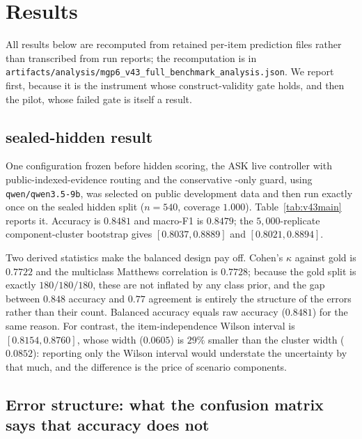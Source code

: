 \section{Results}
\label{sec:results}

All results below are recomputed from retained per-item prediction files rather
than transcribed from run reports; the recomputation is in
\texttt{artifacts/analysis/mgp6\_v43\_full\_benchmark\_analysis.json}. We report
\mgpc{} first, because it is the instrument whose construct-validity gate holds,
and then the \mgp{} pilot, whose failed gate is itself a result.

\subsection{\mgpc{} sealed-hidden result}
\label{sec:results:hidden}

One configuration frozen before hidden scoring, the ASK live controller with
public-indexed-evidence routing and the conservative \abstain-only guard, using
\texttt{qwen/qwen3.5-9b}, was selected on public development data and then run
exactly once on the sealed hidden split ($n=540$, coverage $1.000$).
Table~\ref{tab:v43main} reports it. Accuracy is $0.8481$ and macro-F1 is
$0.8479$; the $5{,}000$-replicate component-cluster bootstrap gives
$[0.8037, 0.8889]$ and $[0.8021, 0.8894]$.

Two derived statistics make the balanced design pay off. Cohen's $\kappa$
against gold is $0.7722$ and the multiclass Matthews correlation is $0.7728$;
because the gold split is exactly $180/180/180$, these are not inflated by any
class prior, and the gap between $0.848$ accuracy and $0.77$ agreement is
entirely the structure of the errors rather than their count. Balanced accuracy
equals raw accuracy ($0.8481$) for the same reason. For contrast, the
item-independence Wilson interval is $[0.8154, 0.8760]$, whose width
($0.0605$) is $29\%$ smaller than the cluster width ($0.0852$): reporting only
the Wilson interval would understate the uncertainty by that much, and the
difference is the price of scenario components.



\subsection{Error structure: what the confusion matrix says that accuracy does not}
\label{sec:results:confusion}

